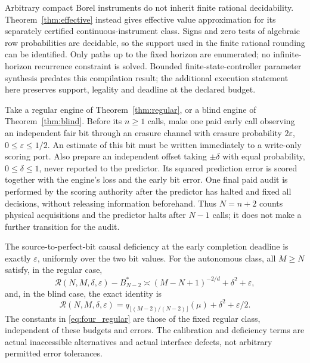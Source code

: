 Arbitrary compact Borel instruments do not inherit finite rational decidability. Theorem~\ref{thm:effective} instead gives effective value approximation for its separately certified continuous-instrument class. Signs and zero tests of algebraic row probabilities are decidable, so the support used in the finite rational rounding can be identified. Only paths up to the fixed horizon are enumerated; no infinite-horizon recurrence constraint is solved. Bounded finite-state-controller parameter synthesis predates this compilation result\cite{junges,poupart}; the additional execution statement here preserves support, legality and deadline at the declared budget.

\begin{corollary}\label{cor:four_resources}
Take a regular engine of Theorem~\ref{thm:regular}, or a blind engine of Theorem~\ref{thm:blind}. Before its $n\ge1$ calls, make one paid early call observing an independent fair bit through an erasure channel with erasure probability $2\varepsilon$, $0\le\varepsilon\le1/2$. An estimate of this bit must be written immediately to a write-only scoring port. Also prepare an independent offset taking $\pm\delta$ with equal probability, $0\le\delta\le1$, never reported to the predictor. Its squared prediction error is scored together with the engine's loss and the early bit error. One final paid audit is performed by the scoring authority after the predictor has halted and fixed all decisions, without releasing information beforehand. Thus $N=n+2$ counts physical acquisitions and the predictor halts after $N-1$ calls; it does not make a further transition for the audit.

The source-to-perfect-bit causal deficiency at the early completion deadline is exactly $\varepsilon$, uniformly over the two bit values. For the autonomous class, all $M\ge N$ satisfy, in the regular case,
\begin{equation}\label{eq:four_regular}
 \mathcal R(N,M,\delta,\varepsilon)-B_{N-2}^*
 \asymp (M-N+1)^{-2/d}+\delta^2+\varepsilon,
\end{equation}
and, in the blind case, the exact identity is
\begin{equation}\label{eq:four_blind}
 \mathcal R(N,M,\delta,\varepsilon)
 =q_{\lfloor(M-2)/(N-2)\rfloor}(\mu)+\delta^2+\varepsilon/2.
\end{equation}
The constants in \eqref{eq:four_regular} are those of the fixed regular class, independent of these budgets and errors. The calibration and deficiency terms are actual inaccessible alternatives and actual interface defects, not arbitrary permitted error tolerances.
\end{corollary}
